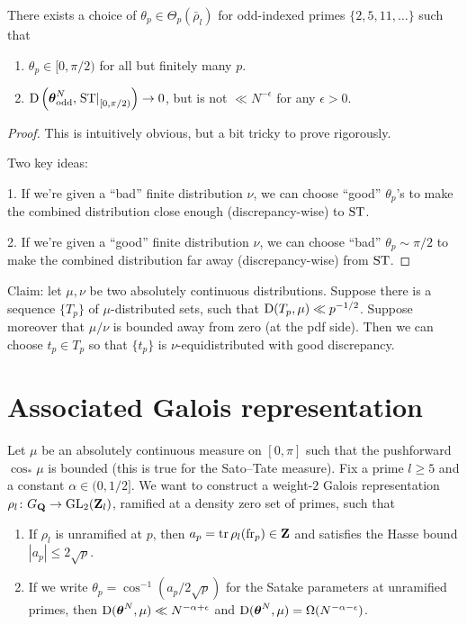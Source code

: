 \begin{theorem}
There exists a choice of $\theta_p\in \Theta_p(\bar\rho_l)$ for odd-indexed 
primes $\{2,5,11,\dots\}$ such that 
\begin{enumerate}
\item
$\theta_p\in [0,\pi/2)$ for all but finitely many $p$. 

\item
$\operatorname{D}\left({\boldsymbol\theta}_{\mathrm{odd}}^N, \left.\mathrm{ST}\right|_{[0,\pi/2)}\right) \to 0$, 
but is not $\ll N^{-\epsilon}$ for any $\epsilon>0$. 
\end{enumerate}
\end{theorem}
\begin{proof}
This is intuitively obvious, but a bit tricky to prove rigorously. 

Two key ideas: 

1. If we're given a ``bad'' finite distribution $\nu$, we can choose ``good'' 
$\theta_p$'s to make the combined distribution close enough (discrepancy-wise) 
to $\mathrm{ST}$. 

2. If we're given a ``good'' finite distribution $\nu$, we can choose ``bad'' 
$\theta_p\sim \pi/2$ to make the combined distribution far away 
(discrepancy-wise) from $\mathrm{ST}$. 
\end{proof}

Claim: let $\mu,\nu$ be two absolutely continuous distributions. Suppose there 
is a sequence $\{T_p\}$ of $\mu$-distributed sets, such that 
$\operatorname{D}(T_p,\mu) \ll p^{-1/2}$. Suppose moreover that $\mu/\nu$ is bounded away 
from zero (at the pdf side). Then we can choose $t_p\in T_p$ so that 
$\{t_p\}$ is $\nu$-equidistributed with good discrepancy. 





\section{Associated Galois representation}

Let $\mu$ be an absolutely continuous measure on $[0,\pi]$ such that the 
pushforward $\cos_\ast \mu$ is bounded (this is true for the Sato--Tate 
measure). Fix a prime $l\geqslant 5$ and a constant $\alpha\in (0,1/2]$. We 
want to construct a weight-$2$ Galois representation 
$\rho_l\colon G_{\mathbf{Q}} \to \operatorname{GL}_2(\mathbf{Z}_l)$, ramified at a density zero set of 
primes, such that 
\begin{enumerate}
\item
If $\rho_l$ is unramified at $p$, then $a_p = \operatorname{tr} \rho_l(\mathrm{fr}_p)\in \mathbf{Z}$ and 
satisfies the Hasse bound $|a_p| \leqslant 2\sqrt p$. 

\item
If we write $\theta_p = \cos^{-1}(a_p / 2\sqrt p)$ for the Satake parameters at 
unramified primes, then $\operatorname{D}({\boldsymbol\theta}^N, \mu) \ll N^{-\alpha+\epsilon}$ and 
$\operatorname{D}({\boldsymbol\theta}^N,\mu) = \Omega(N^{-\alpha-\epsilon})$. 
\end{enumerate}

